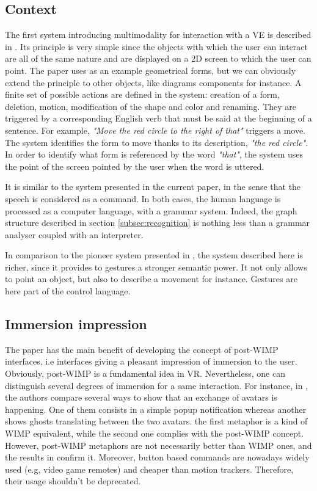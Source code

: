 \documentclass[a4paper]{article}
\begin{document}
\subsection{Context}
The first system introducing multimodality for interaction with a VE is described in \cite{putthatthere}. Its principle is very simple since the objects with which the user can interact are all of the same nature and are displayed on a 2D screen to which the user can point. The paper uses as an example geometrical forms, but we can obviously extend the principle to other objects, like diagrams components for instance. A finite set of possible actions are defined in the system: creation of a form, deletion, motion, modification of the shape and color and renaming. They are triggered by a corresponding English verb that must be said at the beginning of a sentence. For example, \textit{"Move the red circle to the right of that"} triggers a move. The system identifies the form to move thanks to its description, \textit{"the red circle"}. In order to identify what form is referenced by the word \textit{"that"}, the system uses the point of the screen pointed by the user when the word is uttered.

It is similar to the system presented in the current paper, in the sense that the speech is considered as a command. In both cases, the human language is processed as a computer language, with a grammar system. Indeed, the graph structure described in section \ref{subsec:recognition} is nothing less than a grammar analyser coupled with an interpreter.

In comparison to the pioneer system presented in \cite{putthatthere}, the system described here is richer, since it provides to gestures a stronger semantic power. It not only allows to point an object, but also to describe a movement for instance. Gestures are here part of the control language.

\subsection{Immersion impression}
The paper has the main benefit of developing the concept of post-WIMP interfaces, i.e interfaces giving a pleasant impression of immersion to the user. Obviously, post-WIMP is a fundamental idea in VR. Nevertheless, one can distinguish several degrees of immersion for a same interaction. For instance, in \cite{avatars}, the authors compare several ways to show that an exchange of avatars is happening. One of them consists in a simple popup notification whereas another shows ghosts translating between the two avatars. the first metaphor is a kind of WIMP equivalent, while the second one complies with the post-WIMP concept. However, post-WIMP metaphors are not necessarily better than WIMP ones, and the results in \cite{avatars} confirm it. Moreover, button based commands are nowadays widely used (e.g, video game remotes) and cheaper than motion trackers. Therefore, their usage shouldn't be deprecated.
\end{document}
